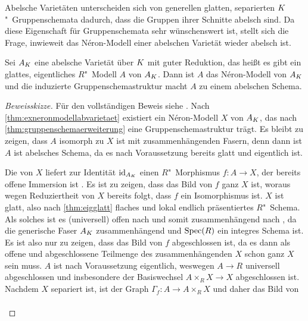 Abelsche Varietäten unterscheiden sich von generellen glatten,
separierten $K$"~Gruppenschemata dadurch, dass die Gruppen ihrer
Schnitte abelsch sind. Da diese Eigenschaft für Gruppenschemata
sehr wünschenswert ist, stellt sich die Frage, inwieweit das
Néron-Modell einer abelschen Varietät wieder abelsch ist. 
\begin{Satz}\label{thm:abelscheneronmodelle}
  Sei $A_{K}$ eine abelsche Varietät über $K$ mit guter Reduktion,
  das heißt es gibt ein glattes, eigentliches $R$"~Modell $A$ von $A_{K}$.
  Dann ist $A$ das Néron-Modell von $A_{K}$ und die induzierte
  Gruppenschemastruktur macht $A$ zu einem abelschen Schema.
  \begin{proof}[Beweisskizze] Für den vollständigen Beweis siehe
    \cite[Proposition~1.4/2]{neron}.
    Nach \ref{thm:exneronmodellabvarietaet} existiert ein
    Néron-Modell $X$ von $A_{K}$, das nach
    \ref{thm:gruppenschemaerweiterung} eine Gruppenschemastruktur
    trägt.
    Es bleibt zu zeigen, dass $A$ isomorph zu $X$ ist
    mit zusammenhängenden Fasern, denn dann ist $A$ ist abelsches
    Schema, da es nach Voraussetzung bereits glatt und eigentlich ist.
    \begin{description}[font=\normalfont\itshape]
    \item[$A$ ist isomorph zu $X$:]
      Die \NAbbEig von $X$ liefert zur Identität $\mathrm{id}_{A_{K}}$ einen
      $R$"~Morphismus $f\colon A\to X$, der bereits offene Immersion ist
      \cite[siehe][4.3/1~(ii) oder 4.4/1]{neron}.
      Es ist zu zeigen, dass das Bild von $f$ ganz $X$ ist, woraus
      wegen Reduziertheit von $X$ bereits folgt, dass $f$ ein
      Isomorphismus ist.
      $X$ ist glatt, also nach
      \ref{thm:eigglatt} flaches und lokal endlich präsentiertes
      $R$"~Schema.
      Als solches ist es (universell) offen nach
      \cite[Theorem~14.33]{wedhorn} und somit zusammenhängend nach
      \cite[Proposition~3.24]{wedhorn},
      da die generische Faser $A_{K}$ zusammenhängend und $\operatorname{Spec}(R)$
      ein integres Schema ist.
      Es ist also nur zu zeigen, dass das Bild von $f$ abgeschlossen
      ist, da es dann als offene und abgeschlossene Teilmenge des
      zusammenhängenden $X$ schon ganz $X$ sein muss.
      $A$ ist nach Voraussetzung eigentlich, weswegen ${A\to R}$
      universell abgeschlossen und insbesondere der Basiswechsel
      ${A\times_R X\to X}$ abgeschlossen ist.
      Nachdem $X$ separiert ist, ist der Graph
      ${\Gamma_f\colon A\to A\times_R X}$ und daher das Bild von
      \begin{gather*}

\end{gather*}
\end{description}
\end{proof}
\end{Satz}
